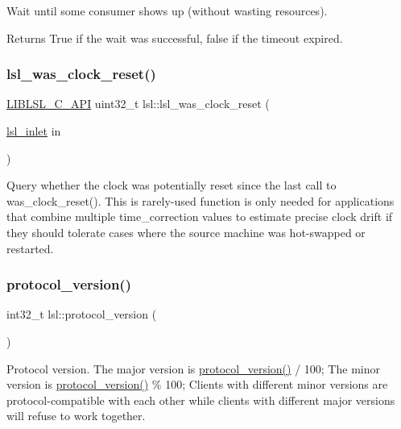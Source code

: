 Wait until some consumer shows up (without wasting resources). \begin{DoxyReturn}{Returns}
True if the wait was successful, false if the timeout expired. 
\end{DoxyReturn}
\mbox{\label{namespacelsl_a3b98f7920895623517758ed1500bcad3}} 
\subsubsection{\texorpdfstring{lsl\+\_\+was\+\_\+clock\+\_\+reset()}{lsl\_was\_clock\_reset()}}
{\footnotesize\ttfamily \hyperlink{lsl__cpp_8h_aafd0ef1813e8be84a1420c4f1df64615}{L\+I\+B\+L\+S\+L\+\_\+\+C\+\_\+\+A\+PI} uint32\+\_\+t lsl\+::lsl\+\_\+was\+\_\+clock\+\_\+reset (\begin{DoxyParamCaption}\item[{\hyperlink{namespacelsl_a884a3363cfcba75d7ce8f00c1c4c54f1}{lsl\+\_\+inlet}}]{in }\end{DoxyParamCaption})}

Query whether the clock was potentially reset since the last call to was\+\_\+clock\+\_\+reset(). This is rarely-\/used function is only needed for applications that combine multiple time\+\_\+correction values to estimate precise clock drift if they should tolerate cases where the source machine was hot-\/swapped or restarted. \mbox{\label{namespacelsl_a59009e83a8f0e33643474b373ad2f7f2}} 
\subsubsection{\texorpdfstring{protocol\+\_\+version()}{protocol\_version()}}
{\footnotesize\ttfamily int32\+\_\+t lsl\+::protocol\+\_\+version (\begin{DoxyParamCaption}{ }\end{DoxyParamCaption})\hspace{0.3cm}{\ttfamily [inline]}}

Protocol version. The major version is \hyperlink{namespacelsl_a59009e83a8f0e33643474b373ad2f7f2}{protocol\+\_\+version()} / 100; The minor version is \hyperlink{namespacelsl_a59009e83a8f0e33643474b373ad2f7f2}{protocol\+\_\+version()} \% 100; Clients with different minor versions are protocol-\/compatible with each other while clients with different major versions will refuse to work together. \mbox{\label{namespacelsl_a4edfbcc31f48f27e8f7c2a36b69cd4b9}} 
